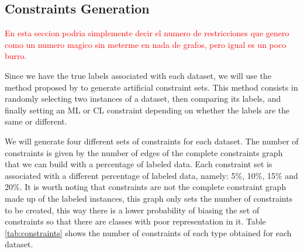 \documentclass[review]{elsarticle}
\begin{document}
\clearpage

\subsection{Constraints Generation}

\textcolor{red}{En esta seccion podria simplemente decir el numero de restricciones que genero como un numero magico sin meterme en nada de grafos, pero igual es un poco burro.}

Since we have the true labels associated with each dataset, we will use the method proposed by \cite{wagstaff2001constrained} to generate artificial constraint sets. This method consists in randomly selecting two instances of a dataset, then comparing its labels, and finally setting an ML or CL constraint depending on whether the labels are the same or different.

We will generate four different sets of constraints for each dataset. The number of constraints is given by the number of edges of the complete constraints graph that we can build with a percentage of labeled data. Each constraint set is associated with a different percentage of labeled data, namely: 5\%, 10\%, 15\% and 20\%. It is worth noting that constraints are not the complete constraint graph made up of the labeled instances, this graph only sets the number of constraints to be created, this way there is a lower probability of biasing the set of constraints so that there are classes with poor representation in it. Table \ref{tab:constraints} shows the number of constraints of each type obtained for each dataset.
\end{document}
